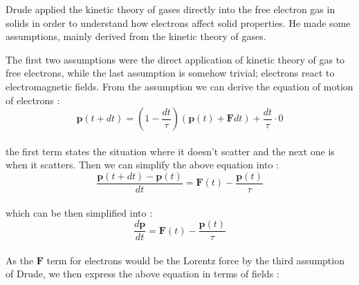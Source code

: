 \documentclass[paper=a4, fontsize=11pt]{scrartcl}
\begin{document}
Drude applied the kinetic theory  of gases directly into the free electron gas in solids in order to understand how electrons affect solid properties. He made some assumptions, mainly derived from the kinetic theory of gases. \\


The first two assumptions were the direct application of kinetic theory of gas to free electrons, while the last assumption is somehow trivial; electrons react to electromagnetic fields. From the assumption we can derive the equation of motion of electrons : \\

\begin{equation}\nonumber
	\mathbf{p}(t+dt) = \left( 1-\frac{dt}{\tau} \right) (\mathbf{p}(t)+\mathbf{F}dt) + \frac{dt}{\tau} \cdot 0
\end{equation}\\

the first term states the situation where it doesn't scatter and the next one is when it scatters. Then we can simplify the above equation into : \\

\begin{equation}\nonumber
\frac{\mathbf{p}(t+dt) - \mathbf{p}(t)}{dt} = \mathbf{F}(t) - \frac{\mathbf{p}(t)}{\tau}
\end{equation}\\

which can be then simplified into : \\

\begin{equation}\nonumber
	 \frac{d\mathbf{p}}{dt} = \mathbf{F}(t) - \frac{\mathbf{p}(t)}{\tau}
\end{equation}\\

As the $\mathbf{F}$ term for electrons would be the Lorentz force by the third assumption of Drude, we then express the above equation in terms of fields : \\
\end{document}
